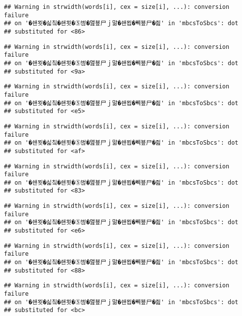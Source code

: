 \documentclass[]{article}
\begin{document}
\begin{verbatim}
## Warning in strwidth(words[i], cex = size[i], ...): conversion failure
## on '�쇈묏�싧칰�쇈묏�⑤벊�앮뵾尸ｊ맒�쇈묍�붹뵾尸�즲' in 'mbcsToSbcs': dot
## substituted for <86>
\end{verbatim}

\begin{verbatim}
## Warning in strwidth(words[i], cex = size[i], ...): conversion failure
## on '�쇈묏�싧칰�쇈묏�⑤벊�앮뵾尸ｊ맒�쇈묍�붹뵾尸�즲' in 'mbcsToSbcs': dot
## substituted for <9a>
\end{verbatim}

\begin{verbatim}
## Warning in strwidth(words[i], cex = size[i], ...): conversion failure
## on '�쇈묏�싧칰�쇈묏�⑤벊�앮뵾尸ｊ맒�쇈묍�붹뵾尸�즲' in 'mbcsToSbcs': dot
## substituted for <e5>
\end{verbatim}

\begin{verbatim}
## Warning in strwidth(words[i], cex = size[i], ...): conversion failure
## on '�쇈묏�싧칰�쇈묏�⑤벊�앮뵾尸ｊ맒�쇈묍�붹뵾尸�즲' in 'mbcsToSbcs': dot
## substituted for <af>
\end{verbatim}

\begin{verbatim}
## Warning in strwidth(words[i], cex = size[i], ...): conversion failure
## on '�쇈묏�싧칰�쇈묏�⑤벊�앮뵾尸ｊ맒�쇈묍�붹뵾尸�즲' in 'mbcsToSbcs': dot
## substituted for <83>
\end{verbatim}

\begin{verbatim}
## Warning in strwidth(words[i], cex = size[i], ...): conversion failure
## on '�쇈묏�싧칰�쇈묏�⑤벊�앮뵾尸ｊ맒�쇈묍�붹뵾尸�즲' in 'mbcsToSbcs': dot
## substituted for <e6>
\end{verbatim}

\begin{verbatim}
## Warning in strwidth(words[i], cex = size[i], ...): conversion failure
## on '�쇈묏�싧칰�쇈묏�⑤벊�앮뵾尸ｊ맒�쇈묍�붹뵾尸�즲' in 'mbcsToSbcs': dot
## substituted for <88>
\end{verbatim}

\begin{verbatim}
## Warning in strwidth(words[i], cex = size[i], ...): conversion failure
## on '�쇈묏�싧칰�쇈묏�⑤벊�앮뵾尸ｊ맒�쇈묍�붹뵾尸�즲' in 'mbcsToSbcs': dot
## substituted for <bc>
\end{verbatim}
\end{document}
